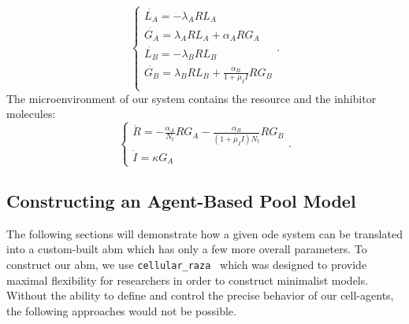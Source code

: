 \documentclass[10pt,A4paper]{article}
\numberwithin{equation}{section}
\begin{document}
%
\begin{equation}
    \begin{cases}
        \dot{L_A} = -\lambda_A R L_A\\
        \dot{G_A} = \lambda_A R L_A + \alpha_A R G_A\\
        \dot{L_B} = -\lambda_B R L_B\\
        \dot{G_B} = \lambda_B R L_B + \frac{\alpha_B}{1 + \mu_I I} R G_B\\
    \end{cases}.
    \label{eq:spatial_limit_F}
\end{equation}
%
The microenvironment of our system contains the resource and the inhibitor molecules:
\begin{equation}
    \begin{cases}
        \dot{R} = -\frac{\alpha_A}{N_t} R G_A-\frac{\alpha_B}{(1 + \mu_I I) N_t} R G_B \\
        \dot{I} = \kappa G_A
    \end{cases}.
    \label{eq:spatial_limit_H}
\end{equation}

\subsection{Constructing an Agent-Based Pool Model}
The following sections will demonstrate how a given \ac{ode} system can be translated into a
custom-built \ac{abm} which has only a few more overall parameters.
To construct our \ac{abm}, we use \texttt{cellular\_raza}~\cite{Pleyer2025} which was designed to
provide maximal flexibility for researchers in order to construct minimalist models.
Without the ability to define and control the precise behavior of our cell-agents, the following
approaches would not be possible.
\end{document}
